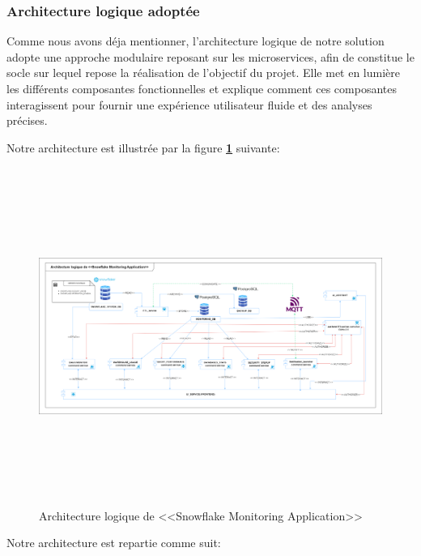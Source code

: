 \subsubsection{Architecture logique adoptée} 
\par Comme nous avons déja mentionner, l'architecture logique de notre solution adopte une approche modulaire reposant sur
 les microservices, afin de constitue le socle sur lequel repose la réalisation de l'objectif du projet. 
 Elle met en lumière les différents composantes fonctionnelles et explique comment ces composantes interagissent pour fournir une expérience utilisateur fluide et des analyses précises\cite{archi_log}. 
 \par Notre architecture est illustrée par la figure \textbf{\ref{fig:arch_log}} suivante:
        \begin{figure}[H]
        \centering
        \includegraphics[width = 1\linewidth ,height=11cm]{img/conception/archi.png}
        \caption{Architecture logique de <<Snowflake Monitoring Application>>}
    \label{fig:arch_log}
        \end{figure}
    \par Notre architecture est repartie comme suit: 
